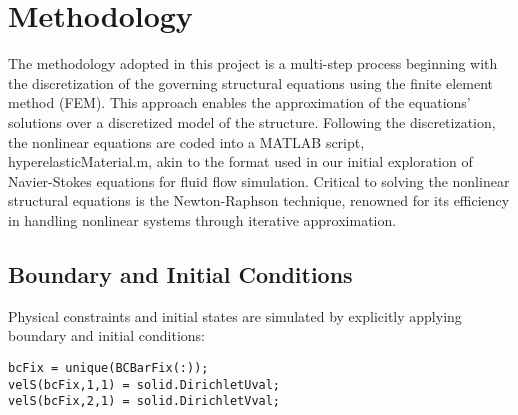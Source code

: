 \documentclass[a4paper,12pt]{article} %
\begin{document}
\section*{Methodology}
The methodology adopted in this project is a multi-step process beginning with the 
discretization of the governing structural equations using the finite element method 
(FEM). This approach enables the approximation of the equations' solutions over a 
discretized model of the structure. Following the discretization, the nonlinear 
equations are coded into a MATLAB script, hyperelasticMaterial.m, akin to the 
format used in our initial exploration of Navier-Stokes equations for fluid flow 
simulation. Critical to solving the nonlinear structural equations is the Newton-Raphson 
technique, renowned for its efficiency in handling nonlinear systems through iterative approximation.

\subsection*{Boundary and Initial Conditions}
Physical constraints and initial states are simulated by explicitly applying boundary and initial conditions:
\begin{verbatim}
bcFix = unique(BCBarFix(:));
velS(bcFix,1,1) = solid.DirichletUval;
velS(bcFix,2,1) = solid.DirichletVval;
\end{verbatim}
\end{document}
